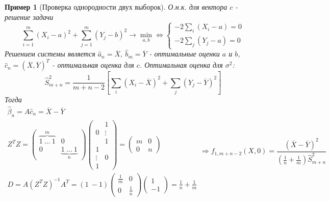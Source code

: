 \documentclass[12pt]{article}
\newtheorem*{example}{Пример}
\theoremstyle{basic_theorem}
\theoremstyle{name_theorem}
\begin{document}
\begin{example}[Проверка однородности двух выборок]
    О.н.к. для вектора $c$ - решение задачи
    \[
        \sum_{i=1}^m(X_i-a)^2+\sum_{j=1}^m(Y_j-b)^2\rightarrow \min_{a, b}
        \Leftrightarrow \begin{cases}
            -2\sum_i(X_i-a) = 0 \\
            -2\sum_j(Y_j-a) = 0
        \end{cases}
    \]
    Решением системы является $\widehat{a}_n=\overline{X},\ \widehat{b}_m=\overline{Y}$ -
    оптимальные оценки $a$ и $b$, $\widehat{c}_n=(\overline{X}, \overline{Y})^T$ - оптимальная
    оценка для $c$. Оптимальная оценка для $\sigma^2$:
    \[
        \widehat{S}^2_{m+n}=\frac{1}{m+n-2}\left[\sum_i(X_i-\overline{X})^2+\sum_j(Y_j-\overline{Y})^2\right]
    \]
    Тогда
    \[
    \begin{array}{l}
        \widehat{\beta}_n=A\widehat{c}_n=\overline{X}-\overline{Y} \\
        Z^TZ=\left(\begin{array}{cc}
            \overbrace{1\ \ldots\ 1}^m & 0 \\
                  0      & \underbrace{1\ \ldots\ 1}_n
        \end{array}\right)
        \left(\begin{array}{cc}
              & 1 \\
            0 & \vdots \\
              & 1 \\
            1  & \\
            \vdots & 0 \\
            1  &
        \end{array}\right) = \left(\begin{array}{cc}
            m & 0 \\
            0 & n
        \end{array}\right) \\
        D=A(Z^TZ)^{-1}A^T=
        \left(1\ -1 \right)
        \left(\begin{array}{cc}
            \frac{1}{m} & 0 \\
            0 & \frac{1}{n}
        \end{array}\right)
        \left(\begin{array}{c}
            1 \\
            -1
        \end{array}\right) = \frac{1}{n} + \frac{1}{m}
    \end{array}
    \Rightarrow
    f_{1, m+n-2}(X,0)=\frac{(\overline{X}-\overline{Y})^2}{\left(\frac{1}{n} + \frac{1}{m}\right)\widehat{S}^2_{m+n}}
\]
\end{example}
\end{document}
